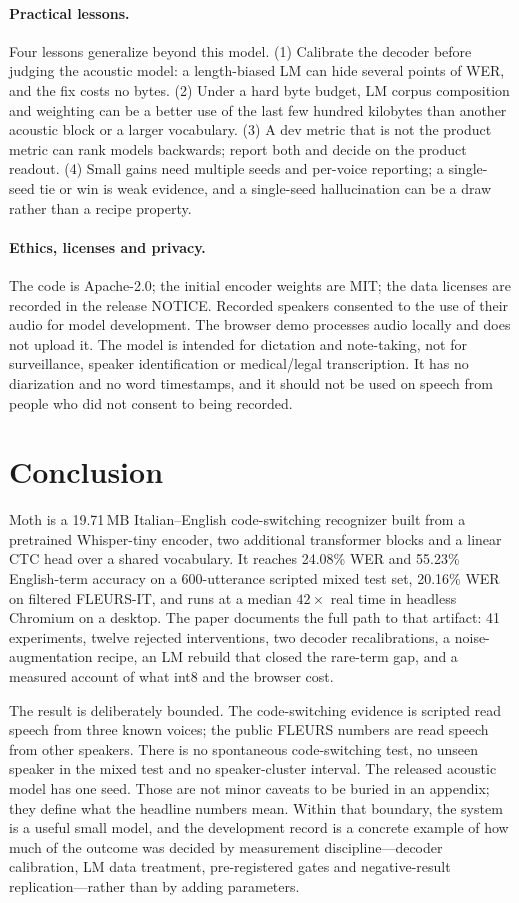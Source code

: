\documentclass{article}
\newcommand{\moth}{Moth}
\begin{document}
\paragraph{Practical lessons.}
Four lessons generalize beyond this model. (1) Calibrate the decoder before judging the acoustic
model: a length-biased LM can hide several points of WER, and the fix costs no bytes. (2) Under a
hard byte budget, LM corpus composition and weighting can be a better use of the last few hundred
kilobytes than another acoustic block or a larger vocabulary. (3) A dev metric that is not the
product metric can rank models backwards; report both and decide on the product readout. (4) Small
gains need multiple seeds and per-voice reporting; a single-seed tie or win is weak evidence, and
a single-seed hallucination can be a draw rather than a recipe property.

\paragraph{Ethics, licenses and privacy.}
The code is Apache-2.0; the initial encoder weights are MIT; the data licenses are recorded in the
release NOTICE. Recorded speakers consented to the use of their audio for model development. The
browser demo processes audio locally and does not upload it. The model is intended for dictation
and note-taking, not for surveillance, speaker identification or medical/legal transcription. It
has no diarization and no word timestamps, and it should not be used on speech from people who did
not consent to being recorded.

\section{Conclusion}

\moth{} is a 19.71\,MB Italian--English code-switching recognizer built from a pretrained
Whisper-tiny encoder, two additional transformer blocks and a linear CTC head over a shared
vocabulary. It reaches 24.08\% WER and 55.23\% English-term accuracy on a 600-utterance scripted
mixed test set, 20.16\% WER on filtered FLEURS-IT, and runs at a median $42\times$ real time in
headless Chromium on a desktop. The paper documents the full path to that artifact: 41 experiments, twelve rejected
interventions, two decoder recalibrations, a noise-augmentation recipe, an LM rebuild that closed
the rare-term gap, and a measured account of what int8 and the browser cost.

The result is deliberately bounded. The code-switching evidence is scripted read speech from
three known voices; the public FLEURS numbers are read speech from other speakers. There is no
spontaneous code-switching test, no unseen speaker in the mixed test and no speaker-cluster interval.
The released acoustic model has one seed. Those are not minor caveats to be buried in an appendix;
they define what the headline numbers mean. Within that boundary, the system is a useful small
model, and the development record is a concrete example of how much of the outcome was decided by
measurement discipline---decoder calibration, LM data treatment, pre-registered gates and
negative-result replication---rather than by adding parameters.
\end{document}
